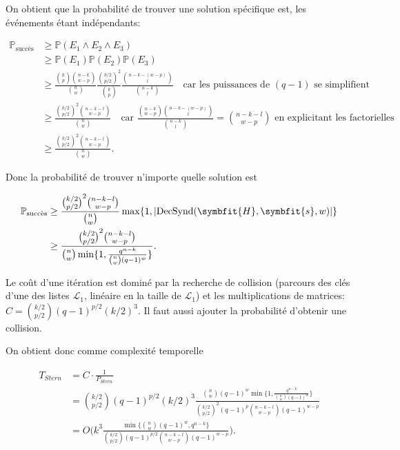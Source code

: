 \documentclass[a4paper,11pt,headings=small,footinclude=false]{scrartcl}
\theoremstyle{definition}
\theoremstyle{remark}
\begin{document}
On obtient que la probabilité de trouver une solution spécifique est, les événements étant indépendants:

\begin{align*}
\mathbb{P}_{\text{succès}} &\geq \mathbb{P}(E_1 \wedge E_2 \wedge E_3)\\
&\geq \mathbb{P}(E_1) \mathbb{P}(E_2) \mathbb{P}(E_3) \\
&\geq \frac{\binom{k}{p}\binom{n-k}{w-p}}{\binom{n}{w}} \frac{\binom{k/2}{p/2}^2}{\binom{k}{p}} \frac{\binom{n-k-(w-p)}{l}}{\binom{n-k}{l}} \quad \text{car les puissances de } (q-1) \text{ se simplifient}\\
&\geq \frac{\binom{k/2}{p/2}^2\binom{n-k-l}{w-p}}{\binom{n}{w}} \quad \text{car } \frac{\binom{n-k}{w-p}\binom{n-k-(w-p)}{l}}{\binom{n-k}{l}} = \binom{n-k-l}{w-p} \text{ en explicitant les factorielles}\\
&\geq \frac{\binom{k/2}{p/2}^2\binom{n-k-l}{w-p}}{\binom{n}{w}}.
\end{align*}

Donc la probabilité de trouver n'importe quelle solution est

\begin{align*}
\mathbb{P}_{\text{succès}} &\geq \frac{\binom{k/2}{p/2}^2\binom{n-k-l}{w-p}}{\binom{n}{w}}\max \{ 1, |\text{DecSynd}(\symbfit{H},\symbfit{s},w)| \}\\
&\geq \frac{\binom{k/2}{p/2}^2\binom{n-k-l}{w-p}}{\binom{n}{w} \min \{ 1, \frac{q^{n-k}}{\binom{n}{w}(q-1)^w} \}}.
\end{align*}

Le coût d'une itération est dominé par la recherche de collision (parcours des clés d'une des listes $\mathcal{L}_1$, linéaire en la taille de $\mathcal{L}_1$) et les multiplications de matrices: $C=\binom{k/2}{p/2}(q-1)^{p/2}(k/2)^3$.
Il faut aussi ajouter la probabilité d'obtenir une collision.

On obtient donc comme complexité temporelle

\begin{align*}
	T_{Stern} &= C \cdot \frac{1}{P_{Stern}}\\
	&= \binom{k/2}{p/2}(q-1)^{p/2}(k/2)^3 \frac{\binom{n}{w}(q-1)^w \min \{ 1, \frac{q^{n-k}}{\binom{n}{w}(q-1)^w} \} }{\binom{k/2}{p/2}^2 (q-1)^p \binom{n-k-l}{w-p}(q-1)^{w-p}}\\
	&= O\Big(k^3 \frac{\min \{ \binom{n}{w}(q-1)^w, q^{n-k}\} }{\binom{k/2}{p/2} (q-1)^{p/2} \binom{n-k-l}{w-p}(q-1)^{w-p}}\Big).
\end{align*}
\end{document}
